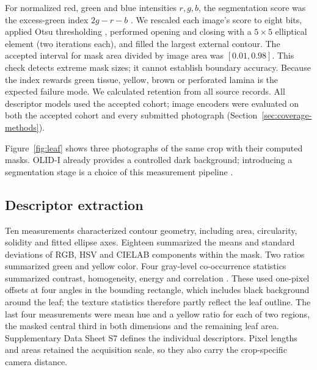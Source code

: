 For normalized red, green and blue intensities $r,g,b$, the segmentation score was the excess-green index $2g-r-b$ \citep{Woebbecke1995}. We rescaled each image's score to eight bits, applied Otsu thresholding \citep{Otsu1979}, performed opening and closing with a $5\times5$ elliptical element (two iterations each), and filled the largest external contour. The accepted interval for mask area divided by image area was $[0.01,0.98]$. This check detects extreme mask sizes; it cannot establish boundary accuracy. Because the index rewards green tissue, yellow, brown or perforated lamina is the expected failure mode. We calculated retention from all source records. All descriptor models used the accepted cohort; image encoders were evaluated on both the accepted cohort and every submitted photograph (Section~\ref{sec:coverage-methods}).

Figure~\ref{fig:leaf} shows three photographs of the same crop with their computed masks. OLID-I already provides a controlled dark background; introducing a segmentation stage is a choice of this measurement pipeline \citep{Orka2023}.
\showpanel{\leafpanel}

\subsection{Descriptor extraction}
Ten measurements characterized contour geometry, including area, circularity, solidity and fitted ellipse axes. Eighteen summarized the means and standard deviations of RGB, HSV and CIELAB components within the mask. Two ratios summarized green and yellow color. Four gray-level co-occurrence statistics summarized contrast, homogeneity, energy and correlation \citep{Haralick1973}. These used one-pixel offsets at four angles in the bounding rectangle, which includes black background around the leaf; the texture statistics therefore partly reflect the leaf outline. The last four measurements were mean hue and a yellow ratio for each of two regions, the masked central third in both dimensions and the remaining leaf area. Supplementary Data Sheet S7 defines the individual descriptors. Pixel lengths and areas retained the acquisition scale, so they also carry the crop-specific camera distance.

